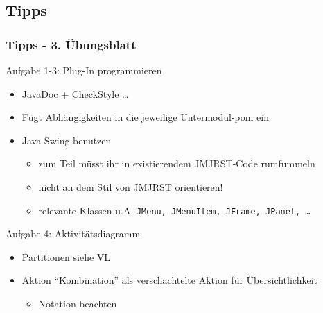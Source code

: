 \documentclass[18pt]{beamer}
\begin{document}
	\subsection{Tipps}
	\begin{frame}
		\frametitle{Tipps - 3. Übungsblatt}
			\begin{exampleblock}{Aufgabe 1-3: Plug-In programmieren}
				\begin{itemize}
					\pause
					\item JavaDoc + CheckStyle \dots \pause
					\item Fügt Abhängigkeiten in die jeweilige Untermodul-pom ein \pause
					\item Java Swing benutzen
					\begin{itemize}
						\item zum Teil müsst ihr in existierendem JMJRST-Code rumfummeln
						\item nicht an dem Stil von JMJRST orientieren!
						\item relevante Klassen u.A. \texttt{JMenu, JMenuItem, JFrame, JPanel, \dots}
					\end{itemize}
				\end{itemize}
			\end{exampleblock}
			\pause
			\begin{exampleblock}{Aufgabe 4: Aktivitätsdiagramm}
				\begin{itemize}
					\item Partitionen siehe VL
					\item Aktion \enquote{Kombination} als verschachtelte Aktion für Übersichtlichkeit
					\begin{itemize}
						\item Notation beachten
					\end{itemize}
				\end{itemize}
			\end{exampleblock}
	\end{frame}
\end{document}

